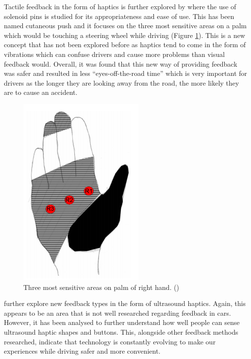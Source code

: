 \documentclass{l4proj}
\begin{document}
Tactile feedback in the form of haptics is further explored by \cite{Shakeri_Brewster_Williamson_Ng_2016} where the use of solenoid pins is studied for its appropriateness and ease of use. This has been named cutaneous push and it focuses on the three most sensitive areas on a palm which would be touching a steering wheel while driving (Figure \ref{fig:cutaneousPush}).  This is a new concept that has not been explored before as haptics tend to come in the form of vibrations which can confuse drivers and cause more problems than visual feedback would. Overall, it was found that this new way of providing feedback was safer and resulted in less “eyes-off-the-road time” which is very important for drivers as the longer they are looking away from the road, the more likely they are to cause an accident.

\begin{figure}[!htb]
    \centering
    \includegraphics[scale = 0.5]{images/cutaneousPush.png}
    \caption{Three most sensitive areas on palm of right hand. (\cite{Shakeri_Brewster_Williamson_Ng_2016})}
    \label{fig:cutaneousPush}

\end{figure}

\cite{Shakeri_Williamson_Brewster_2018} further explore new feedback types in the form of ultrasound haptics. Again, this appears to be an area that is not well researched regarding feedback in cars. However, it has been analysed to further understand how well people can sense ultrasound haptic shapes and buttons. This, alongside other feedback methods researched, indicate that technology is constantly evolving to make our experiences while driving safer and more convenient.
\end{document}
